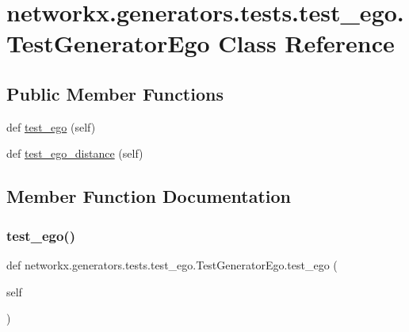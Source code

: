 \hypertarget{classnetworkx_1_1generators_1_1tests_1_1test__ego_1_1TestGeneratorEgo}{}\section{networkx.\+generators.\+tests.\+test\+\_\+ego.\+Test\+Generator\+Ego Class Reference}
\label{classnetworkx_1_1generators_1_1tests_1_1test__ego_1_1TestGeneratorEgo}
\subsection*{Public Member Functions}
\begin{DoxyCompactItemize}
\item 
def \hyperlink{classnetworkx_1_1generators_1_1tests_1_1test__ego_1_1TestGeneratorEgo_acb6f02230adabea8f8b00fd2a2d13cb4}{test\+\_\+ego} (self)
\item 
def \hyperlink{classnetworkx_1_1generators_1_1tests_1_1test__ego_1_1TestGeneratorEgo_a0d37f6b97d1d273ff0c2f724aa4443d9}{test\+\_\+ego\+\_\+distance} (self)
\end{DoxyCompactItemize}


\subsection{Member Function Documentation}
\mbox{\label{classnetworkx_1_1generators_1_1tests_1_1test__ego_1_1TestGeneratorEgo_acb6f02230adabea8f8b00fd2a2d13cb4}} 
\subsubsection{\texorpdfstring{test\+\_\+ego()}{test\_ego()}}
{\footnotesize\ttfamily def networkx.\+generators.\+tests.\+test\+\_\+ego.\+Test\+Generator\+Ego.\+test\+\_\+ego (\begin{DoxyParamCaption}\item[{}]{self }\end{DoxyParamCaption})}

